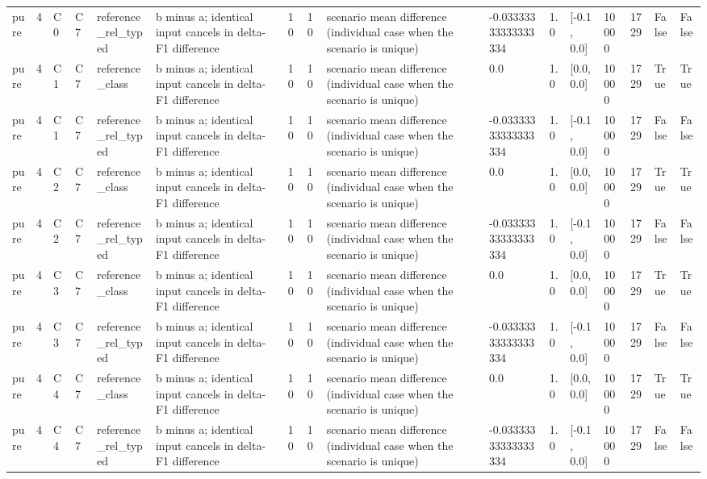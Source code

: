 \begin{tabular}{llllllllllllllll}
pure & 4 & C0 & C7 & reference\_rel\_typed & b minus a; identical input cancels in delta-F1 difference & 10 & 10 & scenario mean difference (individual case when the scenario is unique) & -0.03333333333333334 & 1.0 & [-0.1, 0.0] & 10000 & 1729 & False & False \\
pure & 4 & C1 & C7 & reference\_class & b minus a; identical input cancels in delta-F1 difference & 10 & 10 & scenario mean difference (individual case when the scenario is unique) & 0.0 & 1.0 & [0.0, 0.0] & 10000 & 1729 & True & True \\
pure & 4 & C1 & C7 & reference\_rel\_typed & b minus a; identical input cancels in delta-F1 difference & 10 & 10 & scenario mean difference (individual case when the scenario is unique) & -0.03333333333333334 & 1.0 & [-0.1, 0.0] & 10000 & 1729 & False & False \\
pure & 4 & C2 & C7 & reference\_class & b minus a; identical input cancels in delta-F1 difference & 10 & 10 & scenario mean difference (individual case when the scenario is unique) & 0.0 & 1.0 & [0.0, 0.0] & 10000 & 1729 & True & True \\
pure & 4 & C2 & C7 & reference\_rel\_typed & b minus a; identical input cancels in delta-F1 difference & 10 & 10 & scenario mean difference (individual case when the scenario is unique) & -0.03333333333333334 & 1.0 & [-0.1, 0.0] & 10000 & 1729 & False & False \\
pure & 4 & C3 & C7 & reference\_class & b minus a; identical input cancels in delta-F1 difference & 10 & 10 & scenario mean difference (individual case when the scenario is unique) & 0.0 & 1.0 & [0.0, 0.0] & 10000 & 1729 & True & True \\
pure & 4 & C3 & C7 & reference\_rel\_typed & b minus a; identical input cancels in delta-F1 difference & 10 & 10 & scenario mean difference (individual case when the scenario is unique) & -0.03333333333333334 & 1.0 & [-0.1, 0.0] & 10000 & 1729 & False & False \\
pure & 4 & C4 & C7 & reference\_class & b minus a; identical input cancels in delta-F1 difference & 10 & 10 & scenario mean difference (individual case when the scenario is unique) & 0.0 & 1.0 & [0.0, 0.0] & 10000 & 1729 & True & True \\
pure & 4 & C4 & C7 & reference\_rel\_typed & b minus a; identical input cancels in delta-F1 difference & 10 & 10 & scenario mean difference (individual case when the scenario is unique) & -0.03333333333333334 & 1.0 & [-0.1, 0.0] & 10000 & 1729 & False & False \\

\end{tabular}
